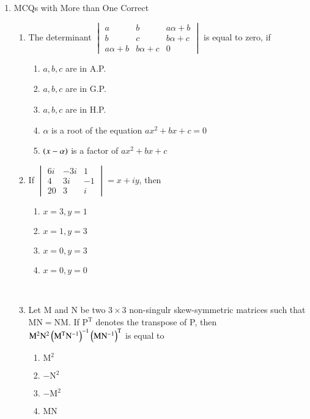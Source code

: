 \documentclass[journal,12pt,twocolumn]{IEEEtran}
\theoremstyle{remark}
\begin{document}
\begin{enumerate}
	\item 
		MCQs with More than One Correct
			\begin{enumerate}
				\item
					The determinant $
							\begin{vmatrix}
								a & b & a \alpha + b\\
								b & c & b \alpha + c\\
								a \alpha + b & b \alpha + c & 0
							\end{vmatrix}
					$ is equal to zero, if
						\begin{enumerate}
									\item $a,b,c$ are in A.P.
									\item $a,b,c$ are in G.P.
									\item $a,b,c$ are in H.P.
									\item $\alpha$ is a root of the equation $ax^2 + bx +c=0$
									\item $\left(x-\alpha\right)$ is a factor of $ax^2 + bx +c$
						\end{enumerate}
						\hfill {}
				\item 
					If $
					\begin{vmatrix}
						6i & -3i & 1\\
						4 & 3i & -1\\
						20 & 3 & i
					\end{vmatrix} = x +iy$, then 
					\begin{enumerate}
						\item $x=3,y=1$
						\item $x=1,y=3$
						\item $x=0,y=3$
						\item $x=0,y=0$
					\end{enumerate}
					\hfill {}\\
				\item 
					Let M and N be two $3 \times 3$ non-singulr skew-symmetric matrices such that $\mathrm{MN=NM}$. If $\mathrm{P^T}$ denotes the transpose of P, then $\mathrm{M^2N^2\left(M^TN^{-1}\right)^{-1} \left(MN^{-1}\right)^T}$ is equal to 
					\begin{enumerate}
						\item $\mathrm{M^2}$
						\item $-\mathrm{N^2}$
						\item $-\mathrm{M^2}$
						\item MN
					\end{enumerate}
					\hfill {}\\

\end{enumerate}
\end{enumerate}
\end{document}
